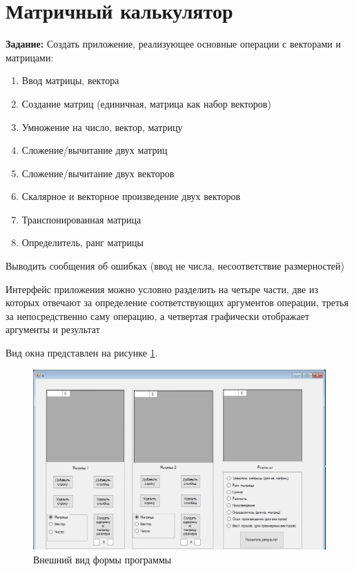 \section{Матричный калькулятор}

\textbf{Задание:} Создать приложение, реализующее основные операции с векторами и матрицами:

\begin{enumerate}
    \item Ввод матрицы, вектора
    \item Создание матриц (единичная, матрица как набор векторов)
    \item Умножение на число, вектор, матрицу
    \item Сложение/вычитание двух матриц
    \item Сложение/вычитание двух векторов
    \item Скалярное и векторное произведение двух векторов
    \item Транспонированная матрица
    \item Определитель, ранг матрицы
\end{enumerate}
Выводить сообщения об ошибках (ввод не числа, несоответствие размерностей)

Интерфейс приложения можно условно разделить на четыре части, две из которых
отвечают за определение соответствующих аргументов операции, третья
за непосредственно саму операцию, а четвертая графически отображает
аргументы и результат

Вид окна представлен на рисунке \ref{fig:task6_form}.
\begin{figure}[H]
    \centering
    \includegraphics[scale=0.7]{task6/form.png}
    \caption{Внешний вид формы программы}
    \label{fig:task6_form}
\end{figure}

